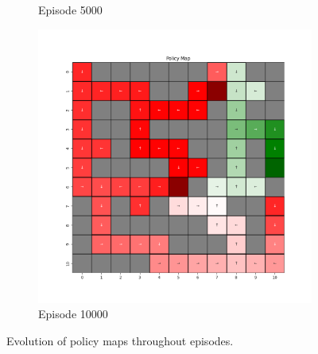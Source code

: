 \documentclass{assignment}
\begin{document}
\begin{figure}[H]
\begin{subfigure}{0.3\textwidth}
    \caption{Episode 5000}
    \end{subfigure}\hfill
    \begin{subfigure}{0.3\textwidth}
        \includegraphics[width=\textwidth]{figures/policy_q/alpha_sweep/policy_alpha_0.1_gamma_0.95_epsilon_0.2_iteration_10000.png}
    \caption{Episode 10000}
    \end{subfigure}
    \caption{Evolution of policy maps throughout episodes.}
    \label{fig:alpha_0.1_q_learning_policy}
\end{figure}
\end{document}
